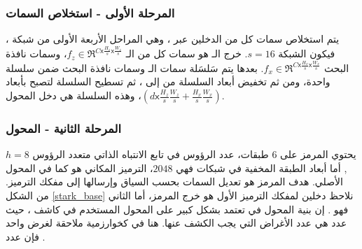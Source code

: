 \subsubsection{المرحلة الأولى - استخلاص السمات}
يتم استخلاص سمات كل من الدخلين عبر 
،
 وهي المراحل الأربعة الأولى من شبكة
،
فيكون
 الشبكة 
 $s = 16$.
\newline
 خرج الـ
 هو سمات كل من الـ
$f_z \in \Re^{C \mathsf{x} \frac{H_z}{s} \mathsf{x} \frac{W_z}{s}}$،
وسمات نافذة البحث
$f_x \in \Re^{C \mathsf{x} \frac{H_x}{s} \mathsf{x} \frac{W_x}{s}}$.
بعدها  يتم سَلسَلة
 سمات الـ
وسمات نافذة البحث ضمن سلسلة واحدة، ومن ثم تخفيض أبعاد السلسلة من 
إلى
، ثم تسطيح 
 السلسلة لتصبح بأبعاد
$( d \mathsf{x} \frac{H_z}{s}\frac{W_z}{s} + \frac{H_x}{s}\frac{W_x}{s} )$،
وهذه السلسلة هي دخل المحول.
\subsubsection{المرحلة الثانية - المحول}
يحتوي المرمز على $6$ طبقات، عدد الرؤوس في تابع الانتباه الذاتي متعدد الرؤوس
$ h=8 $,
أما أبعاد الطبقة المخفية  في شبكات 
فهي
 $2048$،
الترميز المكاني هو 
كما في المحول الأصلي.
\newline
هدف  المرمز هو تعديل السمات بحسب السياق وإرسالها إلى مفكك الترميز.
من الشكل
\ref{stark_base}
نلاحظ دخلين لمفكك الترميز
الأول هو خرج المرمز، أما الثاني فهو
.
إن بنية المحول في
تعتمد بشكل كبير على المحول المستخدم في كاشف
،
حيث عدد
هي عدد الأغراض التي يجب الكشف عنها. هنا في 
كخوارزمية ملاحقة لغرض واحد فإن عدد 
.
